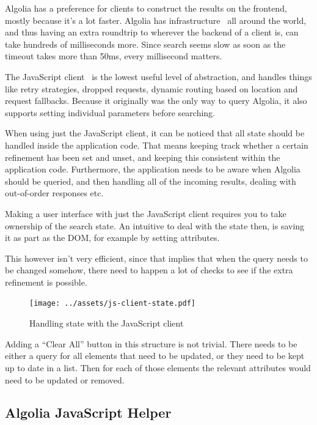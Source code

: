 Algolia has a preference for clients to construct the results on the frontend, mostly because it's a lot faster. Algolia has infrastructure~\cite{algolia-infra} all around the world, and thus having an extra roundtrip to wherever the backend of a client is, can take hundreds of milliseconds more. Since search seems slow as soon as the timeout takes more than 50ms, every millisecond matters.

The JavaScript client~\cite{algolia-js-client} is the lowest useful level of abstraction, and handles things like retry strategies, dropped requests, dynamic routing based on location and request fallbacks. Because it originally was the only way to query Algolia, it also supports setting individual parameters before searching.

When using just the JavaScript client, it can be noticed that all state should be handled inside the application code. That means keeping track whether a certain refinement has been set and unset, and keeping this consistent within the application code. Furthermore, the application needs to be aware when Algolia should be queried, and then handling all of the incoming results, dealing with out-of-order responses etc.

Making a user interface with just the JavaScript client requires you to take ownership of the search state. An intuitive to deal with the state then, is saving it as part as the DOM, for example by setting attributes.

This however isn't very efficient, since that implies that when the query needs to be changed somehow, there need to happen a lot of checks to see if the extra refinement is possible. 

\begin{figure}[H]
\label{figure:js-client-state}
  \centering
  \texttt{[image: ../assets/js-client-state.pdf]}
  \caption{Handling state with the JavaScript client}
\end{figure}

Adding a ``Clear All'' button in this structure is not trivial. There needs to be either a query for all elements that need to be updated, or they need to be kept up to date in a list. Then for each of those elements the relevant attributes would need to be updated or removed.


\subsection{Algolia JavaScript Helper} %
\label{sub:algolia_js_helper}

